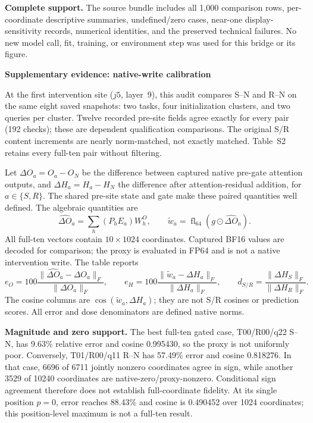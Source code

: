\documentclass[conference]{IEEEtran}
\begin{document}


\noindent\textbf{Complete support.} The source bundle includes all 1,000 comparison rows, per-coordinate descriptive summaries, undefined/zero cases, near-one display-sensitivity records, numerical identities, and the preserved technical failures. No new model call, fit, training, or environment step was used for this bridge or its figure.
\clearpage
\begin{center}{\Large\bfseries Supplementary evidence: native-write calibration}\end{center}
\noindent At the first intervention site ($j5$, layer~9), this audit compares S--N and R--N on the same eight saved snapshots: two tasks, four initialization clusters, and two queries per cluster. Twelve recorded pre-site fields agree exactly for every pair (192 checks); these are dependent qualification comparisons. The original S/R content increments are nearly norm-matched, not exactly matched. Table~S2 retains every full-ten pair without filtering.

\noindent Let $\Delta O_a=O_a-O_N$ be the difference between captured native pre-gate attention outputs, and $\Delta H_a=H_a-H_N$ the difference after attention-residual addition, for $a\in\{S,R\}$. The shared pre-site state and gate make these paired quantities well defined. The algebraic quantities are
\[
 \widehat{\Delta O}_a=\sum_h(P_hE_a)W_h^O,\qquad
 \widetilde w_a=\operatorname{fl}_{64}\!\left(g\odot\widehat{\Delta O}_a\right).
\]
All full-ten vectors contain $10\times1024$ coordinates. Captured BF16 values are decoded for comparison; the proxy is evaluated in FP64 and is not a native intervention write. The table reports
\[
 e_O=100\frac{\|\widehat{\Delta O}_a-\Delta O_a\|_F}{\|\Delta O_a\|_F},
 \qquad
 e_H=100\frac{\|\widetilde w_a-\Delta H_a\|_F}{\|\Delta H_a\|_F},
 \qquad
 d_{S/R}=\frac{\|\Delta H_S\|_F}{\|\Delta H_R\|_F}.
\]
The cosine columns are $\cos(\widetilde w_a,\Delta H_a)$; they are not S/R cosines or prediction scores. All error and dose denominators are defined native norms.



\noindent\textbf{Magnitude and zero support.} The best full-ten gated case, T00/R00/q22 S--N, has 9.63\% relative error and cosine 0.995430, so the proxy is not uniformly poor. Conversely, T01/R00/q11 R--N has 57.49\% error and cosine 0.818276. In that case, 6696 of 6711 jointly nonzero coordinates agree in sign, while another 3529 of 10240 coordinates are native-zero/proxy-nonzero. Conditional sign agreement therefore does not establish full-coordinate fidelity. At its single position $p=0$, error reaches 88.43\% and cosine is 0.490452 over 1024 coordinates; this position-level maximum is not a full-ten result.
\end{document}
